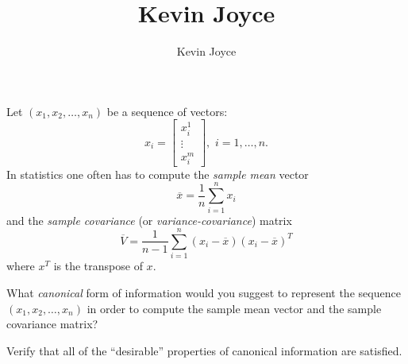\documentclass{homework}
\title{Kevin Joyce}
\author{Kevin Joyce}
\begin{document}
 
\newcommand{\figref}[1]{\figurename~\ref{#1}}
\renewcommand{\bar}{\overline}
\renewcommand{\hat}{\widehat}
\renewcommand{\SS}{\mathcal S}
\newcommand{\HH}{\mathscr H}
\newcommand{\mom}{\widetilde}
\newcommand{\mle}{\widehat \Uptheta}
\newcommand{\eps}{\varepsilon}
\newcommand{\todist}{\stackrel{D}\longrightarrow}
\newcommand{\toprob}{\stackrel{p}\longrightarrow}
\newcommand{\TTheta}{\overline{\underline \Theta} }
\newcommand{\del}{\partial}
\newcommand{\approxsim}{\overset{\cdotp}{\underset{\cdotp}{\sim}}}
\newcommand{\RSS}{\ensuremath{\mathrm{RSS}}}
\newcommand{\MSE}{\ensuremath{\mathrm{MSE}}}
\newcommand{\SE}{\ensuremath{\mathrm{SE}}}
\newcommand{\TSS}{\ensuremath{\mathrm{TSS}}}
\newcommand{\Var}{\ensuremath{\mathrm{Var}}}
\newcommand{\SSReg}{\ensuremath{\mathrm{SSReg}}}
\renewcommand{\a}[1]{{\color{red} \it #1}}

Let $(x_1,x_2,\dots,x_n)$ be a sequence of vectors:
$$
  x_i = \begin{bmatrix} x_i^1 \\ \vdots \\ x_i^m \end{bmatrix},\,\,i = 1,\dots,n.
$$
In statistics one often has to compute the \emph{sample mean} vector
$$
  \bar x = \frac 1n \sum_{i=1}^n x_i
$$
and the \emph{sample covariance} (or \emph{variance-covariance}) matrix
$$
  \bar V = \frac{1}{n-1} \sum_{i=1}^n (x_i - \bar x)(x_i - \bar x)^T
$$
where $x^T$ is the transpose of $x$.

\begin{problem}{}
  What \emph{canonical} form of information would you suggest to represent the sequence $(x_1,x_2,\dots,x_n)$ in order to compute the sample mean vector and the sample covariance matrix?

  Verify that all of the ``desirable'' properties of canonical information are satisfied.
\end{problem}
\end{document}
